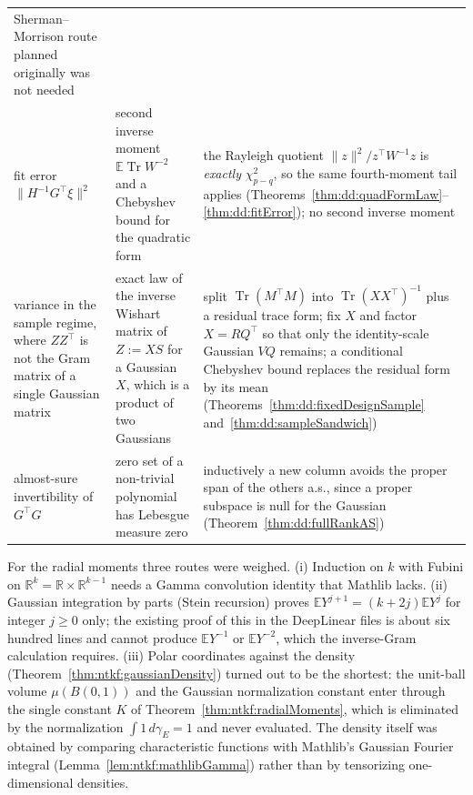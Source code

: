 \begin{remark}
\begin{center}
\begin{tabular}{p{}p{}p{}}
Sherman--Morrison route planned originally was not needed\\[1ex]
fit error $\|H^{-1}G^\top\xi\|^2$ &
second inverse moment $\mathbb E\operatorname{Tr}W^{-2}$ and a Chebyshev bound for the quadratic form &
the Rayleigh quotient $\|z\|^2/z^\top W^{-1}z$ is \emph{exactly} $\chi^2_{p-q}$, so the same fourth-moment tail applies (Theorems~\ref{thm:dd:quadFormLaw}--\ref{thm:dd:fitError}); no second inverse moment\\[1ex]
variance in the sample regime, where $ZZ^\top$ is not the Gram matrix of a single Gaussian matrix &
exact law of the inverse Wishart matrix of $Z:=XS$ for a Gaussian $X$, which is a product of two Gaussians &
split $\operatorname{Tr}(M^\top M)$ into $\operatorname{Tr}(XX^\top)^{-1}$ plus a residual trace form; fix $X$ and factor $X=RQ^\top$ so that only the identity-scale Gaussian $VQ$ remains; a conditional Chebyshev bound replaces the residual form by its mean (Theorems~\ref{thm:dd:fixedDesignSample} and~\ref{thm:dd:sampleSandwich})\\[1ex]
almost-sure invertibility of $G^\top G$ &
zero set of a non-trivial polynomial has Lebesgue measure zero &
inductively a new column avoids the proper span of the others a.s., since a proper subspace is null for the Gaussian (Theorem~\ref{thm:dd:fullRankAS})
\end{tabular}
\end{center}
\end{remark}

\begin{remark}\label{rmk:dd:alternatives}
For the radial moments three routes were weighed. (i) Induction on $k$ with Fubini on $\mathbb R^k=\mathbb R\times\mathbb R^{k-1}$ needs a Gamma
convolution identity that Mathlib lacks. (ii) Gaussian integration by parts (Stein recursion) proves $\mathbb EY^{j+1}=(k+2j)\mathbb EY^j$ for integer $j\ge0$
only; the existing proof of this in the DeepLinear files is about six hundred lines and cannot produce $\mathbb EY^{-1}$ or $\mathbb EY^{-2}$, which the inverse-Gram
calculation requires. (iii) Polar coordinates against the density (Theorem~\ref{thm:ntkf:gaussianDensity}) turned out to be the shortest: the unit-ball volume
$\mu(B(0,1))$ and the Gaussian normalization constant enter through the single constant $K$ of Theorem~\ref{thm:ntkf:radialMoments}, which is eliminated
by the normalization $\int1\,d\gamma_E=1$ and never evaluated. The density itself was obtained by comparing characteristic functions with
Mathlib's Gaussian Fourier integral (Lemma~\ref{lem:ntkf:mathlibGamma}) rather than by tensorizing one-dimensional densities.
\end{remark}

